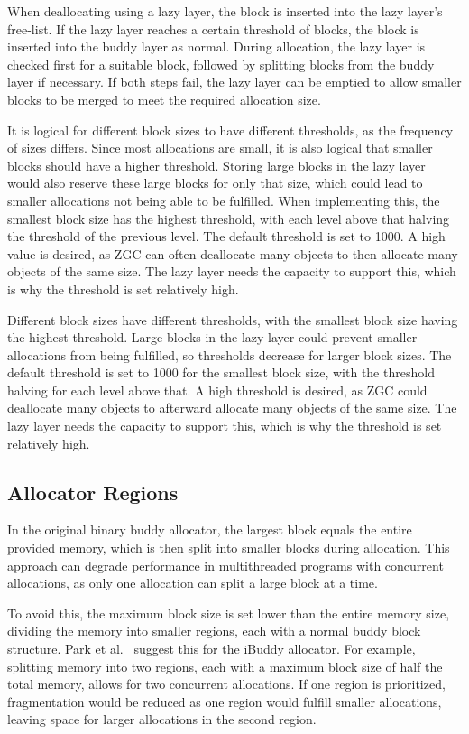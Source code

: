 When deallocating using a lazy layer, the block is inserted into the lazy layer's free-list. If the lazy layer reaches a certain threshold of blocks, the block is inserted into the buddy layer as normal. During allocation, the lazy layer is checked first for a suitable block, followed by splitting blocks from the buddy layer if necessary. If both steps fail, the lazy layer can be emptied to allow smaller blocks to be merged to meet the required allocation size.

It is logical for different block sizes to have different thresholds, as the frequency of sizes differs. Since most allocations are small, it is also logical that smaller blocks should have a higher threshold. Storing large blocks in the lazy layer would also reserve these large blocks for only that size, which could lead to smaller allocations not being able to be fulfilled. When implementing this, the smallest block size has the highest threshold, with each level above that halving the threshold of the previous level. The default threshold is set to 1000. A high value is desired, as ZGC can often deallocate many objects to then allocate many objects of the same size. The lazy layer needs the capacity to support this, which is why the threshold is set relatively high.

Different block sizes have different thresholds, with the smallest block size having the highest threshold. Large blocks in the lazy layer could prevent smaller allocations from being fulfilled, so thresholds decrease for larger block sizes. The default threshold is set to 1000 for the smallest block size, with the threshold halving for each level above that. A high threshold is desired, as ZGC could deallocate many objects to afterward allocate many objects of the same size. The lazy layer needs the capacity to support this, which is why the threshold is set relatively high.

\subsection{Allocator Regions} \label{sec:concurrencyexpl}
In the original binary buddy allocator, the largest block equals the entire provided memory, which is then split into smaller blocks during allocation. This approach can degrade performance in multithreaded programs with concurrent allocations, as only one allocation can split a large block at a time.

To avoid this, the maximum block size is set lower than the entire memory size, dividing the memory into smaller regions, each with a normal buddy block structure. Park et al.~\cite{park2014ibuddy} suggest this for the iBuddy allocator. For example, splitting memory into two regions, each with a maximum block size of half the total memory, allows for two concurrent allocations. If one region is prioritized, fragmentation would be reduced as one region would fulfill smaller allocations, leaving space for larger allocations in the second region.

